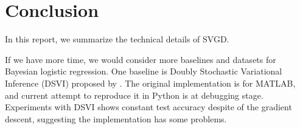 \section{Conclusion}
In this report, we summarize the technical details of SVGD. 

If we have more time, we would consider more baselines and datasets for Bayesian logistic regression. One baseline is Doubly Stochastic Variational Inference (DSVI) proposed by \cite{ref_dsvi}. The original implementation is for MATLAB, and current attempt to reproduce it in Python is at debugging stage. Experiments with DSVI shows constant test accuracy despite of the gradient descent, suggesting the implementation has some problems.
